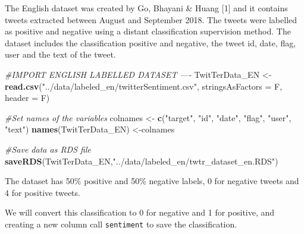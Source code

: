 \documentclass[]{article}
\newenvironment{Shaded}{\begin{snugshade}}{\end{snugshade}}
\newcommand{\KeywordTok}[1]{\textcolor[rgb]{0.13,0.29,0.53}{\textbf{{#1}}}}
\newcommand{\DataTypeTok}[1]{\textcolor[rgb]{0.13,0.29,0.53}{{#1}}}
\newcommand{\StringTok}[1]{\textcolor[rgb]{0.31,0.60,0.02}{{#1}}}
\newcommand{\CommentTok}[1]{\textcolor[rgb]{0.56,0.35,0.01}{\textit{{#1}}}}
\newcommand{\NormalTok}[1]{{#1}}
\begin{document}
The English dataset was created by Go, Bhayani \& Huang {[}1{]} and it
contains tweets extracted between August and September 2018. The tweets
were labelled as positive and negative using a distant classification
supervision method. The dataset includes the classification positive and
negative, the tweet id, date, flag, user and the text of the tweet.

\begin{Shaded}
\begin{Highlighting}[]
\CommentTok{#IMPORT ENGLISH LABELLED DATASET ----}
\NormalTok{TwitTerData_EN <-}\StringTok{ }\KeywordTok{read.csv}\NormalTok{(}\StringTok{"../data/labeled_en/twitterSentiment.csv"}\NormalTok{, }\DataTypeTok{stringsAsFactors =} \NormalTok{F, }\DataTypeTok{header =} \NormalTok{F)}

\CommentTok{#Set names of the variables}
\NormalTok{colnames <-}\StringTok{ }\KeywordTok{c}\NormalTok{(}\StringTok{"target"}\NormalTok{, }\StringTok{"id"}\NormalTok{, }\StringTok{"date"}\NormalTok{, }\StringTok{"flag"}\NormalTok{, }\StringTok{"user"}\NormalTok{, }\StringTok{"text"}\NormalTok{)}
\KeywordTok{names}\NormalTok{(TwitTerData_EN) <-colnames}
 
\CommentTok{#Save data as RDS file}
\KeywordTok{saveRDS}\NormalTok{(TwitTerData_EN,}\StringTok{"../data/labeled_en/twtr_dataset_en.RDS"}\NormalTok{) }
\end{Highlighting}
\end{Shaded}

The dataset has 50\% positive and 50\% negative labels, 0 for negative
tweets and 4 for positive tweets.

\begin{Shaded}
\end{Shaded}

We will convert this classification to 0 for negative and 1 for
positive, and creating a new column call \texttt{sentiment} to save the
classification.
\end{document}
